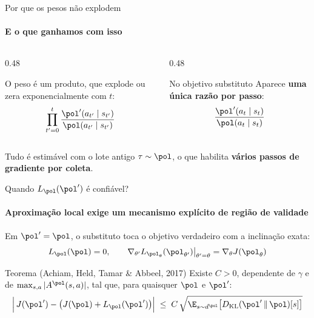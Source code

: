 \documentclass[aspectratio=169, 11pt]{beamer}
\newcommand{\KL}{D_{\mathrm{KL}}}
\begin{document}
\begin{frame}{Por que os pesos não explodem}
  \framesubtitle{E o que ganhamos com isso}

  \begin{columns}[T]
    \begin{column}{0.48\textwidth}
      \begin{exbox}[title={Importância de trajetórias inteiras}]{}
        \small O peso é um produto, que explode ou zera exponencialmente com $t$:
        \[
          \prod_{t'=0}^{t}\frac{\pol'(a_{t'}\mid s_{t'})}{\pol(a_{t'}\mid s_{t'})}
        \]
      \end{exbox}
    \end{column}
    \begin{column}{0.48\textwidth}
      \begin{teobox}{No objetivo substituto}
        \small Aparece \textbf{uma única razão por passo}:
        \[
          \frac{\pol'(a_t\mid s_t)}{\pol(a_t\mid s_t)}
        \]
      \end{teobox}
    \end{column}
  \end{columns}

  \begin{ideiabox}
    Tudo é estimável com o lote antigo $\tau\sim\pol$, o que habilita
    \textbf{vários passos de gradiente por coleta}.
  \end{ideiabox}
\end{frame}

\begin{frame}{Quando $L_{\pol}(\pol')$ é confiável?}
  \framesubtitle{Aproximação local exige um mecanismo explícito de região de validade}

  Em $\pol'=\pol$, o substituto toca o objetivo verdadeiro com a inclinação exata:
  \[
    L_{\pol}(\pol) = 0,\qquad \nabla_{\theta'}L_{\pol_\theta}(\pol_{\theta'})\big|_{\theta'=\theta} = \nabla_\theta J(\pol_\theta)
  \]

  \begin{teobox}{Teorema (Achiam, Held, Tamar \& Abbeel, 2017)}
    Existe $C>0$, dependente de $\gamma$ e de $\max_{s,a}|A^{\pol}(s,a)|$, tal que, para quaisquer $\pol$ e $\pol'$:
    \[
      \Big|\,J(\pol') - \big(J(\pol) + L_{\pol}(\pol')\big)\Big| \;\le\;
        C\,\sqrt{\E_{s\sim d^{\pol}}\big[\KL(\pol'\,\|\,\pol)[s]\big]}
    \]
  \end{teobox}
\end{frame}
\end{document}
